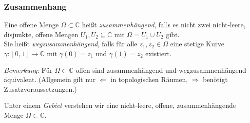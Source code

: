 \documentclass[10pt]{beamer}
\begin{document}
\begin{frame}
	\frametitle{Zusammenhang}
	\pause
	\begin{definition}
		Eine offene Menge $\Omega \subset \mathbb{C}$ heißt \emph{zusammenhängend}, falls es nicht zwei nicht-leere, disjunkte, offene Mengen $U_1, U_2 \subseteq \mathbb{C}$ mit $\Omega = U_1 \cup U_2$ gibt.\\
		Sie heißt \emph{wegzusammenhängend}, falls für alle $z_1, z_2 \in \Omega$ eine stetige Kurve $\gamma \colon [0, 1] \to \mathbb{C}$ mit $\gamma(0) = z_1$ und $\gamma(1) = z_2$ existiert.
	\end{definition}
	\pause
	\emph{Bemerkung:} Für $\Omega \subset \mathbb{C}$ offen sind zusammenhängend und wegzusammenhängend äquivalent. (Allgemein gilt nur \glqq$\Leftarrow$\grqq{} in topologischen Räumen, \glqq$\Rightarrow$\grqq{} benötigt Zusatzvoraussetzungen.)
	\pause
	\begin{definition}
		Unter einem \emph{Gebiet} verstehen wir eine nicht-leere, offene, zusammenhängende Menge $\Omega \subset \mathbb{C}$.
	\end{definition}
\end{frame}
\end{document}
